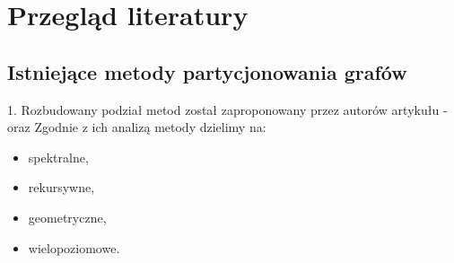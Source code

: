 \newpage


\section{Przegląd literatury}
\label{sec:literature}

\subsection{Istniejące metody partycjonowania grafów}

1. Rozbudowany podział metod został zaproponowany przez autorów artykułu - \cite{metis}
oraz \cite{1364754}
Zgodnie z ich analizą metody dzielimy na:
\begin{itemize}
    \item spektralne,
    \item rekursywne,
    \item geometryczne,
    \item wielopoziomowe.
\end{itemize}

